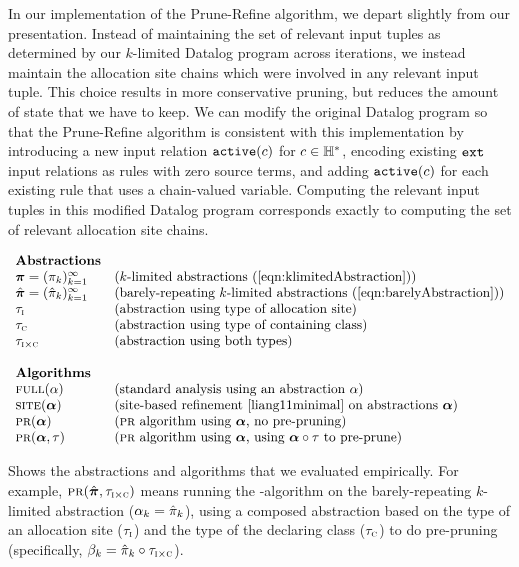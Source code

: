 In our implementation of the Prune-Refine algorithm, we depart slightly from our
presentation.  Instead of maintaining the set of relevant input tuples as
determined by our $k$-limited Datalog program across iterations, we instead
maintain the allocation site chains which were involved in any relevant input
tuple.  This choice results in more conservative pruning, but reduces the
amount of state that we have to keep.
We can modify the original Datalog program so that the Prune-Refine algorithm
is consistent with this implementation by introducing a new input relation
$\text{\tt active}(c)$ for $c \in {\mathbb H}^*$, encoding existing $\text{\tt ext}$ input relations as rules
with zero source terms, and adding $\text{\tt active}(c)$ for each existing
rule that uses a chain-valued variable.  Computing the
relevant input tuples in this modified Datalog program corresponds exactly to
computing the set of relevant allocation site chains.

\begin{table}
\[
\begin{array}{ll}
\text{\bf Abstractions} \\
\Klimabs = (\klimabs_k)_{k=1}^\infty   & \defn{$k$-limited abstractions \refeqn{klimitedAbstraction}} \\
\Klimdabs = (\klimdabs_k)_{k=1}^\infty & \defn{barely-repeating $k$-limited abstractions \refeqn{barelyAbstraction}} \\
\hclassIs                              & \defn{abstraction using type of allocation site} \\
\hclassHas                             & \defn{abstraction using type of containing class} \\
\hclassIsHas                           & \defn{abstraction using both types} \\
\\
\text{\bf Algorithms} \\
\Full(\alpha)         & \defn{standard analysis using an abstraction $\alpha$} \\
\Site(\balpha)        & \defn{site-based refinement \cite{liang11minimal} on abstractions $\balpha$} \\
\PR(\balpha)          & \defn{\PR\ algorithm using $\balpha$, no pre-pruning} \\
\PR(\balpha,\hclass)  & \defn{\PR\ algorithm using $\balpha$, using $\balpha\circ\hclass$ to pre-prune} \\
\end{array}
\]
\caption{\label{tab:algorithms} Shows the abstractions and algorithms that we evaluated empirically.
For example,
$\text{\sc pr}(\hat{\mbox{\boldmath$\pi$}},\tau_{\text{\sc i} \times \text{\sc c}})$
means running the \PR-algorithm on the barely-repeating $k$-limited abstraction ($\alpha_k = \hat{\pi}_k$),
using a composed abstraction based on the type of an allocation site ($\tau_{\text{\sc i}}$) 
and the type of the declaring class ($\tau_{\text{\sc c}}$) to do pre-pruning
(specifically, $\beta_k = \hat{\pi}_k \circ \tau_{\text{\sc i} \times \text{\sc c}}$).
}
\end{table}

